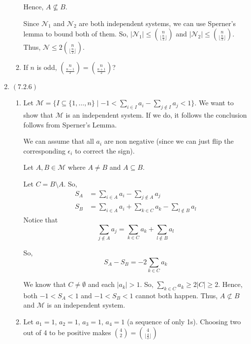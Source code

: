 \documentclass[12pt]{article}
\begin{document}
\begin{enumerate}[start=1,label={\bfseries Problem \arabic*:},leftmargin=1in]
\begin{enumerate}
        Hence, $A \not \subseteq B$. 

        Since $\mathcal{N}_{1}$ and $\mathcal{N}_2$ are both independent systems, we can use Sperner's lemma to bound both of them. 
        So, $\left| \mathcal{N}_{1} \right| \leq \binom{n}{\lfloor \frac{n }{2}\rfloor}$ and $\left| \mathcal{N}_{2} \right| \leq \binom{n}{\lfloor \frac{n }{2}\rfloor}$. Thus, $\mathcal{N} \leq 2\binom{n}{\lfloor \frac{n }{2}\rfloor}$.

        \item If $n$ is odd, $\binom{n}{\frac{n-1}{2}} = \binom{n}{\frac{n+1}{2}}$?
    \end{enumerate}
    
    \item  $(7.2.6)$ 
    \begin{enumerate}
        \item Let $\mathcal{M} = \{ I \subseteq \{ 1, \dots, n \} \mid -1 < \sum_{i \in I} a_{i} - \sum_{j \not \in I} a_{j}  < 1 \}$. 
        We want to show that $\mathcal{M}$ is an independent system. If we do, it follows the conclusion follows from Sperner's Lemma. 
    
        We can assume that all $a_{i}$ are non negative (since we can just flip the corresponding $\epsilon_{i}$ to correct the sign).
        
        Let $A, B \in \mathcal{M}$ where $A \neq B$ and $A \subseteq B$. 
        
        Let $C = B\setminus A$. So, 
        \begin{align*}
            S_{A} &= \sum_{i \in A} a_{i}- \sum_{j \not \in A} a_{j }\\
            S_{B} &= \sum_{i \in A} a_{i} + \sum_{k \in C} a_{k} - \sum_{l \not \in B} a_{l}
        \end{align*}
        Notice that 
        \[ 
            \sum_{j \not \in A} a_{j} = \sum_{k \in C} a_{k }+ \sum_{l \not \in B} a_{l}
        \]
    
        So, 
        \[ 
            S_{A} - S_{B} = -2\sum_{k \in C} a_{k}
        \]
    
        We know that $C \neq \emptyset$ and each $\left|  a_{k}  \right| > 1$. 
        So, $\sum_{k \in C} a_{k} \geq 2 \left| C \right| \geq 2$. Hence, both $-1 < S_{A} < 1$ and $-1 < S_{B} < 1$ cannot both happen. 
        Thus, $A \not \subset B$ and $\mathcal{M}$ is an independent system. 
        \item Let $a_{1} = 1$, $a_{2} = 1$, $a_{3} = 1$, $a_{4} = 1$  (a sequence of only 1s). Choosing two out of 4 to be positive makes $\binom{4}{2} = \binom{4}{\lfloor \frac{4}{2} \rfloor}$ 
    \end{enumerate}
    

\end{enumerate}
\end{document}
